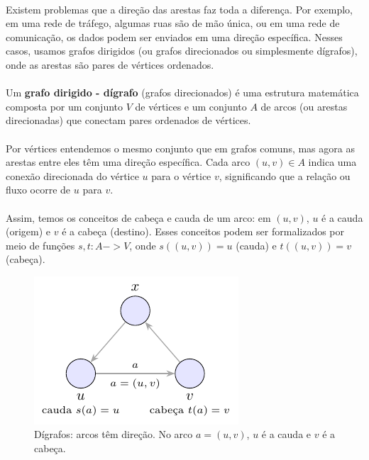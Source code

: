 \documentclass[12pt,a4paper]{article}
\def\emph#1{#1}%
\def\to{->}%
\begin{document}
\paragraph{}
Existem problemas que a direção das arestas faz toda a diferença. Por exemplo, em uma rede de tráfego, algumas ruas são de mão única, ou em uma rede de comunicação, os dados podem ser enviados em uma direção específica. Nesses casos, usamos \emph{grafos dirigidos} (ou grafos direcionados ou simplesmente dígrafos), onde as arestas são pares de vértices ordenados.

\paragraph{}
Um \textbf{grafo dirigido - dígrafo} (grafos direcionados) é uma estrutura matemática composta por um conjunto \(V\) de \emph{vértices} e um conjunto \(A\) de \emph{arcos} (ou \emph{arestas direcionadas}) que conectam pares ordenados de vértices.

\paragraph{}
Por vértices entendemos o mesmo conjunto que em grafos comuns, mas agora as arestas entre eles têm uma direção específica. Cada arco \((u, v) \in A\) indica uma conexão direcionada do vértice \(u\) para o vértice \(v\), significando que a relação ou fluxo ocorre de \(u\) para \(v\).

\paragraph{}
Assim, temos os conceitos de cabeça e cauda de um arco: em \((u, v)\), \(u\) é a \emph{cauda} (origem) e \(v\) é a \emph{cabeça} (destino). Esses conceitos podem ser formalizados por meio de funções \(s, t: A \to V\), onde \(s((u, v)) = u\) (cauda) e \(t((u, v)) = v\) (cabeça).


\begin{figure}[H]
    \centering
    \includegraphics[width=0.9\linewidth]{figures/fig_def_digrafo.pdf}

    \caption{Dígrafos: arcos têm direção. No arco $a=(u,v)$, $u$ é a \emph{cauda} e $v$ é a \emph{cabeça}.}
    \label{fig:def-digrafo}
    \end{figure}
\end{document}
